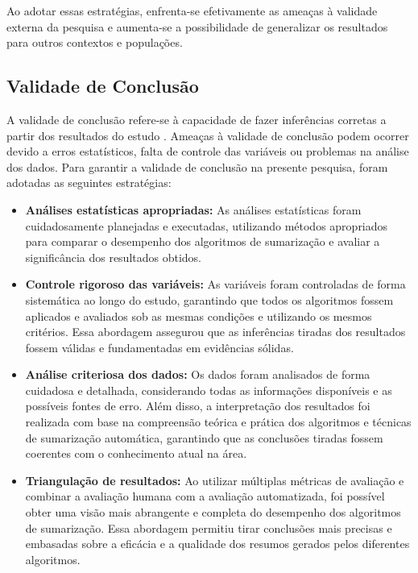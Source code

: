 Ao adotar essas estratégias, enfrenta-se efetivamente as ameaças à validade externa da pesquisa e aumenta-se a possibilidade de generalizar os resultados para outros contextos e populações.

\subsection{Validade de Conclusão}
A validade de conclusão refere-se à capacidade de fazer inferências corretas a partir dos resultados do estudo \cite{shadish2002experimental}. Ameaças à validade de conclusão podem ocorrer devido a erros estatísticos, falta de controle das variáveis ou problemas na análise dos dados. Para garantir a validade de conclusão na presente pesquisa, foram adotadas as seguintes estratégias:

\begin{itemize}
    \item \textbf{Análises estatísticas apropriadas:} As análises estatísticas foram cuidadosamente planejadas e executadas, utilizando métodos apropriados para comparar o desempenho dos algoritmos de sumarização e avaliar a significância dos resultados obtidos.
    \item \textbf{Controle rigoroso das variáveis:} As variáveis foram controladas de forma sistemática ao longo do estudo, garantindo que todos os algoritmos fossem aplicados e avaliados sob as mesmas condições e utilizando os mesmos critérios. Essa abordagem assegurou que as inferências tiradas dos resultados fossem válidas e fundamentadas em evidências sólidas.
    \item \textbf{Análise criteriosa dos dados:} Os dados foram analisados de forma cuidadosa e detalhada, considerando todas as informações disponíveis e as possíveis fontes de erro. Além disso, a interpretação dos resultados foi realizada com base na compreensão teórica e prática dos algoritmos e técnicas de sumarização automática, garantindo que as conclusões tiradas fossem coerentes com o conhecimento atual na área.
    \item \textbf{Triangulação de resultados:} Ao utilizar múltiplas métricas de avaliação e combinar a avaliação humana com a avaliação automatizada, foi possível obter uma visão mais abrangente e completa do desempenho dos algoritmos de sumarização. Essa abordagem permitiu tirar conclusões mais precisas e embasadas sobre a eficácia e a qualidade dos resumos gerados pelos diferentes algoritmos.
\end{itemize}

